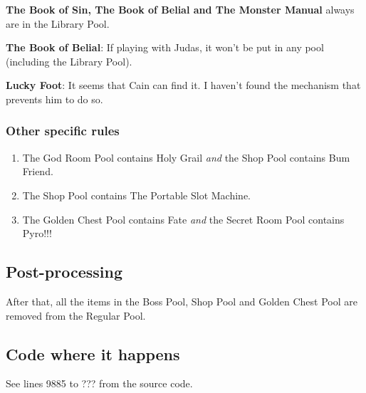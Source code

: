 \noindent \textbf{The Book of Sin, The Book of Belial and The Monster Manual} always are in the Library Pool.

\noindent \textbf{The Book of Belial}: If playing with Judas, it won't be put in any pool (including the Library Pool).

\noindent \textbf{Lucky Foot}: It seems that Cain can find it. I haven't found the mechanism that prevents him to do so.

\subsubsection*{Other specific rules}

\begin{table}[H]
\end{table}

\begin{enumerate}[(1) :]
\item The God Room Pool contains Holy Grail \textit{and} the Shop Pool contains Bum Friend.
\item The Shop Pool contains The Portable Slot Machine.
\item The Golden Chest Pool contains Fate \textit{and} the Secret Room Pool contains Pyro!!!
\end{enumerate}

\subsection{Post-processing}
After that, all the items in the Boss Pool, Shop Pool and Golden Chest Pool are removed from the Regular Pool.

\subsection{Code where it happens}
See lines 9885 to ??? from the source code.
